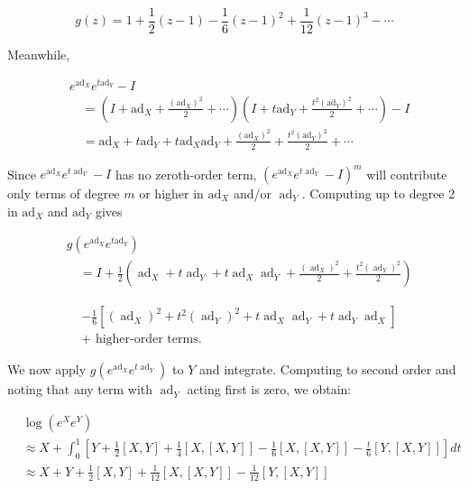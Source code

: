 \documentclass[10pt, letterpaper]{article}
\begin{document}
$$
g(z)=1+\frac{1}{2}(z-1)-\frac{1}{6}(z-1)^{2}+\frac{1}{12}(z-1)^{3}-\cdots
$$

Meanwhile,

$$
\begin{aligned}
& e^{\mathrm{ad}_{X}} e^{t \mathrm{ad}_{Y}}-I \\
& \quad=\left(I+\mathrm{ad}_{X}+\frac{\left(\mathrm{ad}_{X}\right)^{2}}{2}+\cdots\right)\left(I+t \mathrm{ad}_{Y}+\frac{t^{2}\left(\mathrm{ad}_{Y}\right)^{2}}{2}+\cdots\right)-I \\
& \quad=\mathrm{ad}_{X}+t \mathrm{ad}_{Y}+t \mathrm{ad}_{X} \mathrm{ad}_{Y}+\frac{\left(\mathrm{ad}_{X}\right)^{2}}{2}+\frac{t^{2}\left(\mathrm{ad}_{Y}\right)^{2}}{2}+\cdots
\end{aligned}
$$

Since $e^{\operatorname{ad}_{X}} e^{t \operatorname{ad}_{Y}}-I$ has no zeroth-order term, $\left(e^{\operatorname{ad}_{X}} e^{t \operatorname{ad}_{Y}}-I\right)^{m}$ will contribute only terms of degree $m$ or higher in $\mathrm{ad}_{X}$ and/or $\operatorname{ad}_{Y}$. Computing up to degree 2 in $\mathrm{ad}_{X}$ and $\mathrm{ad}_{Y}$ gives

$$
\begin{aligned}
& g\left(e^{\mathrm{ad}_{X}} e^{t \mathrm{ad}_{Y}}\right) \\
& \quad=I+\frac{1}{2}\left(\operatorname{ad}_{X}+t \operatorname{ad}_{Y}+t \operatorname{ad}_{X} \operatorname{ad}_{Y}+\frac{\left(\operatorname{ad}_{X}\right)^{2}}{2}+\frac{t^{2}\left(\operatorname{ad}_{Y}\right)^{2}}{2}\right)
\end{aligned}
$$

$$
\begin{aligned}
& -\frac{1}{6}\left[\left(\operatorname{ad}_{X}\right)^{2}+t^{2}\left(\operatorname{ad}_{Y}\right)^{2}+t \operatorname{ad}_{X} \operatorname{ad}_{Y}+t \operatorname{ad}_{Y} \operatorname{ad}_{X}\right] \\
& + \text { higher-order terms. }
\end{aligned}
$$

We now apply $g\left(e^{\operatorname{ad}_{X}} e^{t \operatorname{ad}_{Y}}\right)$ to $Y$ and integrate. Computing to second order and noting that any term with $\operatorname{ad}_{Y}$ acting first is zero, we obtain:

$$
\begin{aligned}
& \log \left(e^{X} e^{Y}\right) \\
& \approx X+\int_{0}^{1}\left[Y+\frac{1}{2}[X, Y]+\frac{1}{4}[X,[X, Y]]-\frac{1}{6}[X,[X, Y]]-\frac{t}{6}[Y,[X, Y]]\right] d t \\
& \approx X+Y+\frac{1}{2}[X, Y]+\frac{1}{12}[X,[X, Y]]-\frac{1}{12}[Y,[X, Y]]
\end{aligned}
$$
\end{document}
